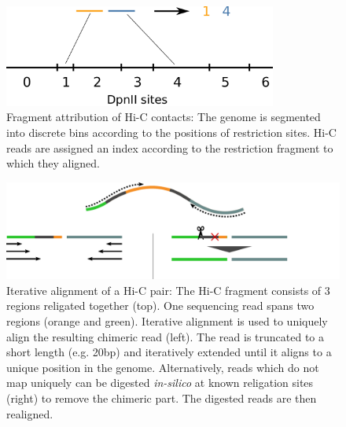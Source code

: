 \begin{figure}[htb]
    \includegraphics[width=0.8\textwidth]{Parts/Part02/gfx/hicstuff/hic_pipeline_attribution.pdf}
    \caption[Fragment attribution of Hi-C contacts.]{Fragment attribution of Hi-C contacts: The genome is segmented into discrete bins according to the positions of restriction sites. Hi-C reads are assigned an index according to the restriction fragment to which they aligned.}
    \label{fig:02-01:attribution}
\end{figure}

\begin{figure}[htb]
    \includegraphics[width=1\textwidth]{Parts/Part02/gfx/hicstuff/iteralign.pdf}
    \caption[Iterative alignment of a Hi-C pair.]{Iterative alignment of a Hi-C pair: The Hi-C fragment consists of 3 regions religated together (top). One sequencing read spans two regions (orange and green). Iterative alignment is used to uniquely align the resulting chimeric read (left). The read is truncated to a short length (e.g. 20bp) and iteratively extended until it aligns to a unique position in the genome. Alternatively, reads which do not map uniquely can be digested \textit{in-silico} at known religation sites (right) to remove the chimeric part. The digested reads are then realigned.}
    \label{fig:02-01:iteralign}
\end{figure}

